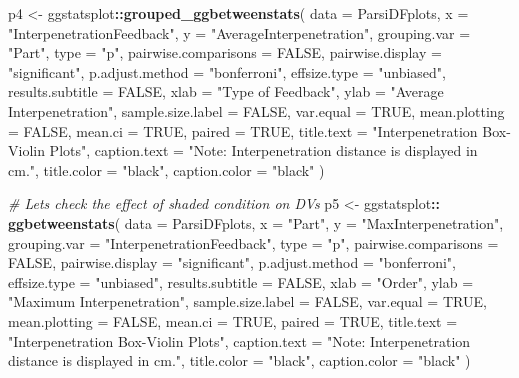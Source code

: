 \documentclass[
]{article}
\newenvironment{Shaded}{\begin{snugshade}}{\end{snugshade}}
\newcommand{\CommentTok}[1]{\textcolor[rgb]{0.56,0.35,0.01}{\textit{#1}}}
\newcommand{\DataTypeTok}[1]{\textcolor[rgb]{0.13,0.29,0.53}{#1}}
\newcommand{\KeywordTok}[1]{\textcolor[rgb]{0.13,0.29,0.53}{\textbf{#1}}}
\newcommand{\NormalTok}[1]{#1}
\newcommand{\OperatorTok}[1]{\textcolor[rgb]{0.81,0.36,0.00}{\textbf{#1}}}
\newcommand{\OtherTok}[1]{\textcolor[rgb]{0.56,0.35,0.01}{#1}}
\newcommand{\StringTok}[1]{\textcolor[rgb]{0.31,0.60,0.02}{#1}}
\begin{document}
\begin{Shaded}
\begin{Highlighting}[]
\NormalTok{p4 <-}\StringTok{ }\NormalTok{ggstatsplot}\OperatorTok{::}\KeywordTok{grouped_ggbetweenstats}\NormalTok{(}
  \DataTypeTok{data =}\NormalTok{ ParsiDFplots,}
  \DataTypeTok{x =} \StringTok{"InterpenetrationFeedback"}\NormalTok{,}
  \DataTypeTok{y =} \StringTok{"AverageInterpenetration"}\NormalTok{,}
  \DataTypeTok{grouping.var =} \StringTok{"Part"}\NormalTok{,}
  \DataTypeTok{type =} \StringTok{"p"}\NormalTok{,}
  \DataTypeTok{pairwise.comparisons =} \OtherTok{FALSE}\NormalTok{,}
  \DataTypeTok{pairwise.display =} \StringTok{"significant"}\NormalTok{,}
  \DataTypeTok{p.adjust.method =} \StringTok{"bonferroni"}\NormalTok{,}
  \DataTypeTok{effsize.type =} \StringTok{"unbiased"}\NormalTok{,}
  \DataTypeTok{results.subtitle =} \OtherTok{FALSE}\NormalTok{,}
  \DataTypeTok{xlab =} \StringTok{"Type of Feedback"}\NormalTok{,}
  \DataTypeTok{ylab =} \StringTok{"Average Interpenetration"}\NormalTok{,}
  \DataTypeTok{sample.size.label =} \OtherTok{FALSE}\NormalTok{,}
  \DataTypeTok{var.equal =} \OtherTok{TRUE}\NormalTok{,}
  \DataTypeTok{mean.plotting =} \OtherTok{FALSE}\NormalTok{,}
  \DataTypeTok{mean.ci =} \OtherTok{TRUE}\NormalTok{,}
  \DataTypeTok{paired =} \OtherTok{TRUE}\NormalTok{,}
  \DataTypeTok{title.text =} \StringTok{"Interpenetration Box-Violin Plots"}\NormalTok{,}
  \DataTypeTok{caption.text =} \StringTok{"Note: Interpenetration distance is displayed in cm."}\NormalTok{,}
  \DataTypeTok{title.color =} \StringTok{"black"}\NormalTok{,}
  \DataTypeTok{caption.color =} \StringTok{"black"}
\NormalTok{) }

\CommentTok{# Lets check the effect of shaded condition on DVs}
\NormalTok{p5 <-}\StringTok{ }\NormalTok{ggstatsplot}\OperatorTok{::}\StringTok{ }\KeywordTok{ggbetweenstats}\NormalTok{(}
  \DataTypeTok{data =}\NormalTok{ ParsiDFplots,}
  \DataTypeTok{x =} \StringTok{"Part"}\NormalTok{,}
  \DataTypeTok{y =} \StringTok{"MaxInterpenetration"}\NormalTok{,}
  \DataTypeTok{grouping.var =} \StringTok{"InterpenetrationFeedback"}\NormalTok{,}
  \DataTypeTok{type =} \StringTok{"p"}\NormalTok{,}
  \DataTypeTok{pairwise.comparisons =} \OtherTok{FALSE}\NormalTok{,}
  \DataTypeTok{pairwise.display =} \StringTok{"significant"}\NormalTok{,}
  \DataTypeTok{p.adjust.method =} \StringTok{"bonferroni"}\NormalTok{,}
  \DataTypeTok{effsize.type =} \StringTok{"unbiased"}\NormalTok{,}
  \DataTypeTok{results.subtitle =} \OtherTok{FALSE}\NormalTok{,}
  \DataTypeTok{xlab =} \StringTok{"Order"}\NormalTok{,}
  \DataTypeTok{ylab =} \StringTok{"Maximum Interpenetration"}\NormalTok{,}
  \DataTypeTok{sample.size.label =} \OtherTok{FALSE}\NormalTok{,}
  \DataTypeTok{var.equal =} \OtherTok{TRUE}\NormalTok{,}
  \DataTypeTok{mean.plotting =} \OtherTok{FALSE}\NormalTok{,}
  \DataTypeTok{mean.ci =} \OtherTok{TRUE}\NormalTok{,}
  \DataTypeTok{paired =} \OtherTok{TRUE}\NormalTok{,}
  \DataTypeTok{title.text =} \StringTok{"Interpenetration Box-Violin Plots"}\NormalTok{,}
  \DataTypeTok{caption.text =} \StringTok{"Note: Interpenetration distance is displayed in cm."}\NormalTok{,}
  \DataTypeTok{title.color =} \StringTok{"black"}\NormalTok{,}
  \DataTypeTok{caption.color =} \StringTok{"black"}
\NormalTok{  ) }


\end{Highlighting}
\end{Shaded}
\end{document}
